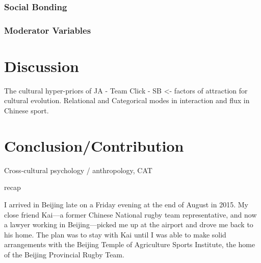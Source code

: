   \subsubsection{Social Bonding}



  \subsubsection{Moderator Variables}

\section{Discussion}

The cultural hyper-priors of JA - Team Click - SB <- factors of attraction for cultural evolution.
Relational and Categorical modes in interaction and flux in Chinese sport.

\section{Conclusion/Contribution}
Cross-cultural psychology / anthropology, CAT

recap





























I arrived in Beijing late on a Friday evening at the end of August in 2015.  My close friend Kai---a former Chinese National rugby team representative, and now a lawyer working in Beijing---picked me up at the airport and drove me back to his home.  The plan was to stay with Kai until I was able to make solid arrangements with the Beijing Temple of Agriculture Sports Institute, the home of the Beijing Provincial Rugby Team.

